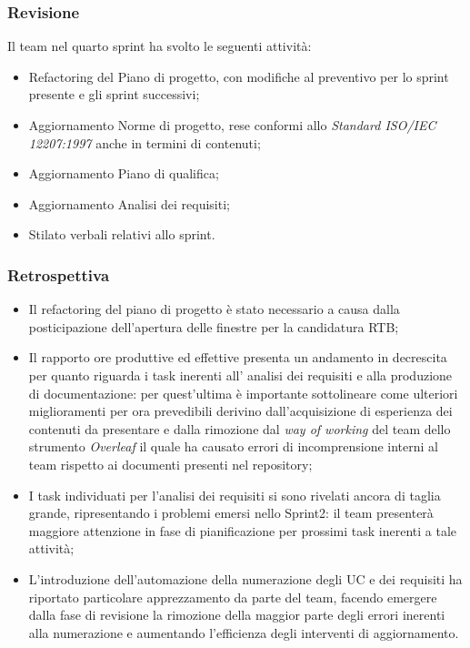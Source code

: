 \documentclass[10pt, a4paper]{article}
\begin{document}
\subsubsection{Revisione}
Il team nel quarto sprint ha svolto le seguenti attività:
\begin{itemize}
    \item Refactoring del Piano di progetto, con modifiche al preventivo per lo sprint presente e gli sprint successivi;
    \item Aggiornamento Norme di progetto, rese conformi allo \textit{Standard ISO/IEC 12207:1997} anche in termini di contenuti; 
    \item Aggiornamento Piano di qualifica;
    \item Aggiornamento Analisi dei requisiti;
    \item Stilato verbali relativi allo sprint.
\end{itemize}
\subsubsection{Retrospettiva}
\begin{itemize}
\item Il refactoring del piano di progetto è stato necessario a causa dalla posticipazione dell'apertura delle finestre per la candidatura RTB;
\item Il rapporto ore produttive ed effettive presenta un andamento in decrescita per quanto riguarda i task inerenti all' analisi dei requisiti e alla produzione di documentazione: per 
quest'ultima è importante sottolineare come ulteriori miglioramenti per ora prevedibili derivino dall'acquisizione di esperienza dei contenuti da presentare e dalla rimozione dal \textit{way of working\pg} del team
dello strumento \textit{Overleaf} il quale ha causato errori di incomprensione interni al team rispetto ai documenti presenti nel repository;
\item I task individuati per l'analisi dei requisiti si sono rivelati ancora di taglia grande, ripresentando i problemi emersi nello Sprint2: il team presenterà maggiore attenzione
in fase di pianificazione per prossimi task inerenti a tale attività;
\item L'introduzione dell'automazione della numerazione degli UC e dei requisiti ha riportato particolare apprezzamento da parte del team, facendo emergere dalla fase di revisione
la rimozione della maggior parte degli errori inerenti alla numerazione e aumentando l'efficienza degli interventi di aggiornamento. 
\end{itemize}
 
\end{document}

